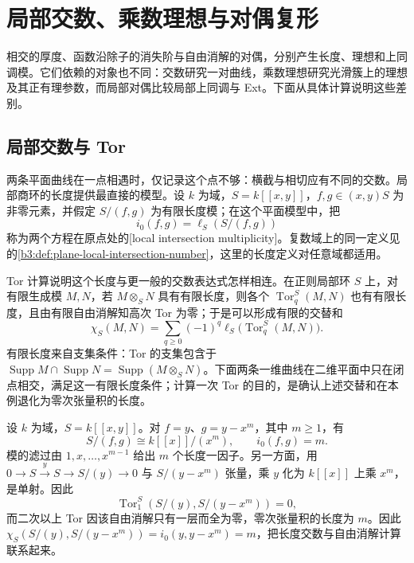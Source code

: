 
\section{局部交数、乘数理想与对偶复形}
\label{b3:sec:C04}

%
%
%



相交的厚度、函数沿除子的消失阶与自由消解的对偶，分别产生长度、理想和上同调模。它们依赖的对象也不同：交数研究一对曲线，乘数理想研究光滑簇上的理想及其正有理参数，而局部对偶比较局部上同调与 Ext。下面从具体计算说明这些差别。

\subsection{局部交数与 Tor}
\label{b3:subsec:C04:01}

两条平面曲线在一点相遇时，仅记录这个点不够：横截与相切应有不同的交数。局部商环的长度提供最直接的模型。设 \(k\) 为域，\(S=k[\![x,y]\!]\)，\(f,g\in(x,y)S\) 为非零元素，并假定 \(S/(f,g)\) 为有限长度模；在这个平面模型中，把
\[
	i_0(f,g)=\ell_S(S/(f,g))
\]
称为两个方程在原点处的[local intersection multiplicity]。复数域上的同一定义见的\cref{b3:def:plane-local-intersection-number}，这里的长度定义对任意域都适用。

\ProseParagraphBreak
Tor 计算说明这个长度与更一般的交数表达式怎样相连。在正则局部环 \(S\) 上，对有限生成模 \(M,N\)，若 \(M\otimes_SN\) 具有有限长度，则各个 \(\operatorname{Tor}_q^S(M,N)\) 也有有限长度，且由有限自由消解知高次 Tor 为零；于是可以形成有限的交替和
\[
	\chi_S(M,N)=\sum_{q\ge0}(-1)^q\ell_S\bigl(\operatorname{Tor}_q^S(M,N)\bigr).
\]
有限长度来自支集条件：Tor 的支集包含于 \(\operatorname{Supp}M\cap\operatorname{Supp}N=\operatorname{Supp}(M\otimes_SN)\)。下面两条一维曲线在二维平面中只在闭点相交，满足这一有限长度条件；计算一次 Tor 的目的，是确认上述交替和在本例退化为零次张量积的长度。

\begin{example}\label{b3:exm:plane-contact-multiplicity}
	设 \(k\) 为域，\(S=k[\![x,y]\!]\)。对 \(f=y\)、\(g=y-x^m\)，其中 \(m\ge1\)，有
	\[
		S/(f,g)\cong k[\![x]\!]/(x^m),\qquad i_0(f,g)=m.
	\]
	模的滤过由 \(1,x,\ldots,x^{m-1}\) 给出 \(m\) 个长度一因子。另一方面，用 \(0\to S\xrightarrow{y}S\to S/(y)\to0\) 与 \(S/(y-x^m)\) 张量，乘 \(y\) 化为 \(k[\![x]\!]\) 上乘 \(x^m\)，是单射。因此
	\[
		\operatorname{Tor}_1^S(S/(y),S/(y-x^m))=0,
	\]
	而二次以上 Tor 因该自由消解只有一层而全为零，零次张量积的长度为 \(m\)。因此 \(\chi_S(S/(y),S/(y-x^m))=i_0(y,y-x^m)=m\)，把长度交数与自由消解计算联系起来。
\end{example}

